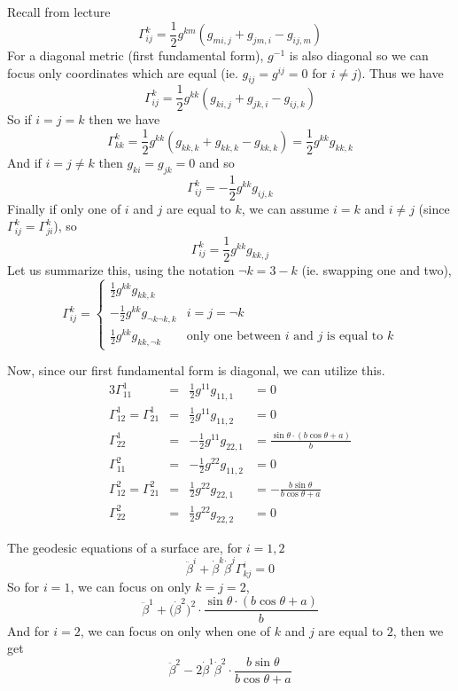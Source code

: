 \documentclass[10pt]{article}
\begin{document}
        \item Recall from lecture
        \[ \Gamma_{ij}^k = \frac12g^{km}(g_{mi,j} + g_{jm,i} - g_{ij,m}) \]
        For a diagonal metric (first fundamental form), $g^{-1}$ is also diagonal so we can focus only coordinates which are equal (ie. $g_{ij}=g^{ij}=0$ for $i\neq j$).
        Thus we have
        \[ \Gamma_{ij}^k = \frac12g^{kk}(g_{ki,j} + g_{jk,i} - g_{ij,k}) \]
        So if $i=j=k$ then we have
        \[ \Gamma_{kk}^k = \frac12g^{kk}(g_{kk,k} + g_{kk,k} - g_{kk,k}) = \frac12g^{kk}g_{kk,k} \]
        And if $i=j\neq k$ then $g_{ki}=g_{jk}=0$ and so
        \[ \Gamma_{ij}^k = -\frac12g^{kk}g_{ij,k} \]
        Finally if only one of $i$ and $j$ are equal to $k$, we can assume $i=k$ and $i\neq j$ (since $\Gamma_{ij}^k=\Gamma_{ji}^k$), so
        \[ \Gamma_{ij}^k =\frac12g^{kk}g_{kk,j} \]
        Let us summarize this, using the notation $\neg k=3-k$ (ie. swapping one and two),
        \[ \Gamma_{ij}^k = \begin{cases} \frac12g^{kk}g_{kk,k} \\ -\frac12g^{kk}g_{\neg k\neg k,k} & i=j=\neg k \\ \frac12g^{kk}g_{kk,\neg k} & \text{only one between $i$ and $j$ is equal to $k$}
        \end{cases} \]
        
        Now, since our first fundamental form is diagonal, we can utilize this.
        \begin{alignat*}{3}
            \Gamma_{11}^1 &=& \frac12g^{11}g_{11,1} &= 0 \\
            \Gamma_{12}^1 = \Gamma_{21}^1 &=& \frac12g^{11}g_{11,2} &= 0 \\
            \Gamma_{22}^1 &=& -\frac12g^{11}g_{22,1} &= \frac{\sin\theta\cdot(b\cos\theta+a)}b \\
            \Gamma_{11}^2 &=& -\frac12g^{22}g_{11,2} &= 0 \\
            \Gamma_{12}^2 = \Gamma_{21}^2 &=& \frac12g^{22}g_{22,1} &= -\frac{b\sin\theta}{b\cos\theta+a} \\
            \Gamma_{22}^2 &=& \frac12g^{22}g_{22,2} &= 0
        \end{alignat*}

        \item The geodesic equations of a surface are, for $i=1,2$
        \[ \ddot\beta^i + \dot\beta^k\dot\beta^j\Gamma_{kj}^i = 0 \]
        So for $i=1$, we can focus on only $k=j=2$,
        \[ \ddot\beta^1 + \bigl(\dot\beta^2\bigr)^2\cdot\frac{\sin\theta\cdot(b\cos\theta+a)}b \]
        And for $i=2$, we can focus on only when one of $k$ and $j$ are equal to $2$, then we get
        \[ \ddot\beta^2 - 2\dot\beta^1\dot\beta^2\cdot\frac{b\sin\theta}{b\cos\theta+a} \]
    \eenum
\end{document}
